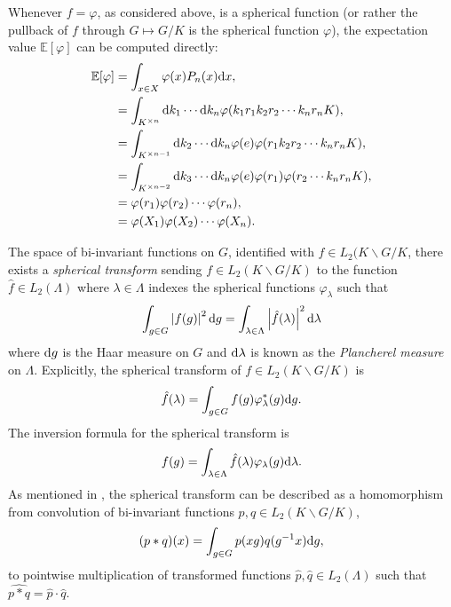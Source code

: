 \documentclass[notitlepage]{article}
\begin{document}
Whenever $f=\varphi$, as considered above, is a spherical function (or rather the pullback of $f$ through $G \mapsto G/K$ is the spherical function $\varphi$), the expectation value $\mathbb E[\varphi]$ can be computed directly:
\begin{align}
    \mathbb E [ \varphi ] 
    &= \int_{x \in X} \varphi(x) P_n(x)\mathrm{d} x, \\
    &= \int_{K^{\times n}} \mathrm{d} k_1 \cdots \mathrm{d} k_n \varphi(k_1r_1k_2r_2\cdots k_nr_nK), \\
    &= \int_{K^{\times n-1}} \mathrm{d} k_2 \cdots \mathrm{d} k_n \varphi(e)\varphi(r_1k_2r_2\cdots k_nr_nK), \\
    &= \int_{K^{\times n-2}} \mathrm{d} k_3 \cdots \mathrm{d} k_n \varphi(e)\varphi(r_1)\varphi(r_2\cdots k_nr_nK), \\
    &= \varphi(r_1)\varphi(r_2) \cdots \varphi(r_n), \\
    &= \varphi(X_1)\varphi(X_2) \cdots \varphi(X_n).
\end{align}

The space of bi-invariant functions on $G$, identified with $f \in L_2(K\backslash G / K$, there exists a \textit{spherical transform} sending $f \in L_2(K \backslash G / K)$ to the function $\hat f \in L_2(\Lambda)$ where $\lambda \in \Lambda$ indexes the spherical functions $\varphi_\lambda$ such that
\begin{equation}
    \int_{g \in G} \left|f(g)\right|^{2} \mathrm{d} g = \int_{\lambda \in \Lambda} \left|\hat f (\lambda)\right|^{2} \mathrm{d} \lambda
\end{equation}
where $\mathrm{d} g$ is the Haar measure on $G$ and $\mathrm{d} \lambda$ is known as the \textit{Plancherel measure} on $\Lambda$.
Explicitly, the spherical transform of $f \in L_2(K \backslash G / K)$ is
\begin{equation}
    \hat f(\lambda) = \int_{g \in G} f(g) \varphi_{\lambda}^{*}(g) \mathrm{d} g.
\end{equation}
The inversion formula for the spherical transform is
\begin{equation}
    f(g) = \int_{\lambda \in \Lambda} \hat f(\lambda) \varphi_{\lambda}(g) \mathrm{d} \lambda.
\end{equation}
As mentioned in \cite[Remark 3.4.3]{klyachko2000random}, the spherical transform can be described as a homomorphism from convolution of bi-invariant functions $p,q \in L_2(K\backslash G / K)$,
\begin{equation}
    (p \ast q)(x) = \int_{g \in G} p(x g) q(g^{-1}x) \mathrm{d} g,
\end{equation}
to pointwise multiplication of transformed functions $\hat p , \hat q \in L_2(\Lambda)$ such that $\widehat{p\ast q} = \hat p \cdot \hat q$.
\end{document}
